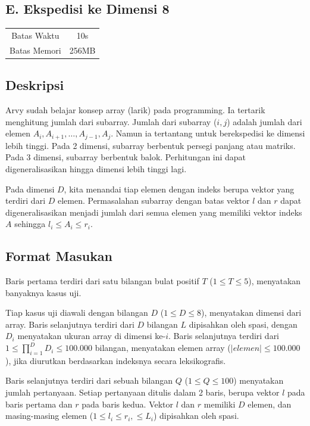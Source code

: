 \documentclass{article}
\begin{document}
\begin{center}
    \section*{E. Ekspedisi ke Dimensi 8}

    \begin{tabular}{ | c c | }
        \hline
        Batas Waktu  & 10s \\
        Batas Memori & 256MB \\
        \hline
    \end{tabular}
\end{center}

\subsection*{Deskripsi}

Arvy sudah belajar konsep array (larik) pada programming.
Ia tertarik menghitung jumlah dari subarray.
Jumlah dari subarray ($i, j$) adalah jumlah dari elemen $A_i, A_{i+1}, \dots, A_{j-1}, A_j$.
Namun ia tertantang untuk berekspedisi ke dimensi lebih tinggi.
Pada 2 dimensi, subarray berbentuk persegi panjang atau matriks.
Pada 3 dimensi, subarray berbentuk balok.
Perhitungan ini dapat digeneralisasikan hingga dimensi lebih tinggi lagi.

Pada dimensi $D$, kita menandai tiap elemen dengan indeks berupa vektor yang terdiri dari $D$ elemen.
Permasalahan subarray dengan batas vektor $l$ dan $r$ dapat digeneralisasikan menjadi jumlah dari semua elemen yang memiliki vektor indeks $A$ sehingga $l_i \leq A_i \leq r_i$.

\subsection*{Format Masukan}

Baris pertama terdiri dari satu bilangan bulat positif $T$ ($1 \leq T \leq 5$), menyatakan banyaknya kasus uji.

Tiap kasus uji diawali dengan bilangan $D$ ($1 \leq D \leq 8$), menyatakan dimensi dari array.
Baris selanjutnya terdiri dari $D$ bilangan $L$ dipisahkan oleh spasi, dengan $D_i$ menyatakan ukuran array di dimensi ke-$i$.
Baris selanjutnya terdiri dari $1 \leq \prod_{i=1}^{D}{D_i} \leq 100.000$ bilangan, menyatakan elemen array ($|elemen| \leq 100.000$), jika diurutkan berdasarkan indeksnya secara leksikografis.

Baris selanjutnya terdiri dari sebuah bilangan $Q$ ($1 \leq Q \leq 100$) menyatakan jumlah pertanyaan.
Setiap pertanyaan ditulis dalam 2 baris, berupa vektor $l$ pada baris pertama dan $r$ pada baris kedua. Vektor $l$ dan $r$ memiliki $D$ elemen, dan masing-masing elemen ($1 \leq l_i \leq r_i, \leq L_i$) dipisahkan oleh spasi.
\end{document}
